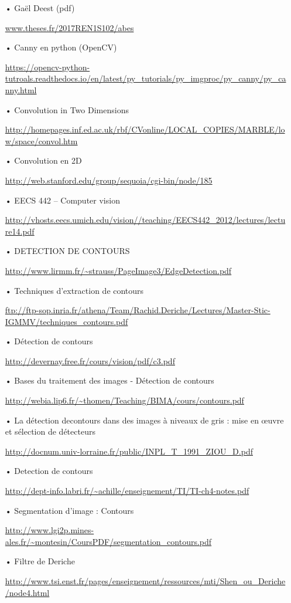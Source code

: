 \begin{itemize}
\item[•] Gaël Deest (pdf)
\item[] \url{www.theses.fr/2017REN1S102/abes} 

\item[•] Canny en python (OpenCV)
\item[] \url{https://opencv-python-tutroals.readthedocs.io/en/latest/py_tutorials/py_imgproc/py_canny/py_canny.html} 

\item[•] Convolution in Two Dimensions
\item[] \url{http://homepages.inf.ed.ac.uk/rbf/CVonline/LOCAL_COPIES/MARBLE/low/space/convol.htm} 

\item[•] Convolution en 2D
\item[] \url{http://web.stanford.edu/group/sequoia/cgi-bin/node/185} 

\item[•] EECS 442 \--- Computer vision
\item[] \url{http://vhosts.eecs.umich.edu/vision//teaching/EECS442_2012/lectures/lecture14.pdf} 

\item[•] DETECTION DE CONTOURS
\item[] \url{http://www.lirmm.fr/~strauss/PageImage3/EdgeDetection.pdf}

\item[•] Techniques d’extraction de contours
\item[] \url{ftp://ftp-sop.inria.fr/athena/Team/Rachid.Deriche/Lectures/Master-Stic-IGMMV/techniques_contours.pdf}

\item[•] Détection de contours
\item[] \url{http://devernay.free.fr/cours/vision/pdf/c3.pdf}

\item[•] Bases du traitement des images - Détection de contours
\item[] \url{http://webia.lip6.fr/~thomen/Teaching/BIMA/cours/contours.pdf}

\item[•] La détection decontours dans des images à niveaux de gris : mise en œuvre et sélection de détecteurs 
\item[] \url{http://docnum.univ-lorraine.fr/public/INPL_T_1991_ZIOU_D.pdf}

\item[•] Detection de contours
\item[] \url{http://dept-info.labri.fr/~achille/enseignement/TI/TI-ch4-notes.pdf}

\item[•] Segmentation d'image : Contours
\item[] \url{http://www.lgi2p.mines-ales.fr/~montesin/CoursPDF/segmentation_contours.pdf}

\item[•] Filtre de Deriche
\item[] \url{http://www.tsi.enst.fr/pages/enseignement/ressources/mti/Shen_ou_Deriche/node4.html}

\end{itemize}
